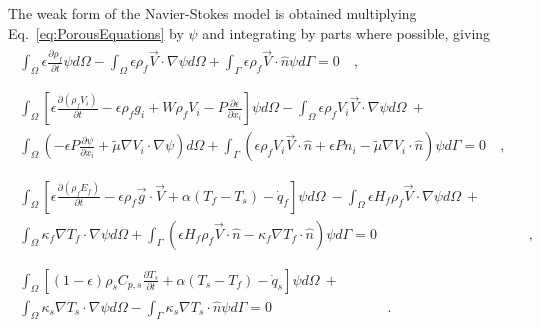 The weak form of the Navier-Stokes model is obtained multiplying Eq.\ \eqref{eq:PorousEquations} by \(\psi\) and integrating by parts where possible, giving
\begin{subequations}
\label{eq:PronghornEquations_V2WeakForm}
\begin{align}
\label{eq:MassWeak}
\begin{split}
\int_{\Omega}\epsilon\frac{\partial\rho_f}{\partial t}\psi d\Omega-\int_\Omega\epsilon\rho_f\vec{V}\cdot\nabla\psi d\Omega+\int_\Gamma\epsilon\rho_f\vec{V}\cdot\hat{n}\psi d\Gamma=0&\ ,\\
&\end{split}\\
%
%
\label{eq:MomWeak}
\begin{split}\int_\Omega\left\lbrack\epsilon\frac{\partial(\rho_fV_i)}{\partial t}-\epsilon\rho_f g_i+W\rho_fV_i-P\frac{\partial\epsilon}{\partial x_i}\right\rbrack\psi d\Omega -\int_\Omega \epsilon\rho_fV_i\vec{V}\cdot\nabla\psi d\Omega\ +\hspace{1cm}&\\
\int_\Omega \left(-\epsilon P\frac{\partial\psi}{\partial x_i}+\tilde{\mu}\nabla V_i\cdot\nabla\psi\right)d\Omega+\int_\Gamma\left(\epsilon\rho_fV_i\vec{V}\cdot\hat{n} + \epsilon Pn_i-\tilde{\mu}\nabla V_i\cdot\hat{n}\right)\psi d\Gamma=0&\ ,\\
&
\end{split}\\
%
%
\label{eq:EnergyWeak}
\begin{split}
\int_\Omega\left\lbrack\epsilon\frac{\partial(\rho_fE_f)}{\partial t}-\epsilon\rho_f\vec{g}\cdot\vec{V}+\alpha(T_f-T_s)-\dot{q}_f\right\rbrack\psi d\Omega\ -\int_\Omega \epsilon H_f\rho_f\vec{V}\cdot\nabla\psi d\Omega\ +\hspace{1cm}&\\
\int_\Omega\kappa_f\nabla T_f\cdot\nabla\psi d\Omega+\int_\Gamma\left(\epsilon H_f\rho_f\vec{V}\cdot\hat{n}-\kappa_f\nabla T_f\cdot\hat{n}\right)\psi d\Gamma=0&\ ,\\
&
\end{split}\\
%
%
\begin{split}\int_\Omega\left\lbrack(1-\epsilon)\rho_sC_{p,s}\frac{\partial T_s}{\partial t}+\alpha(T_s-T_f)-\dot{q}_s\right\rbrack\psi d\Omega\ +\hspace{1cm}\\
\int_\Omega\kappa_s\nabla T_s\cdot\nabla\psi d\Omega-\int_\Gamma\kappa_s\nabla T_s\cdot\hat{n}\psi d\Gamma=0&\ .\end{split}
\end{align}
\end{subequations}

